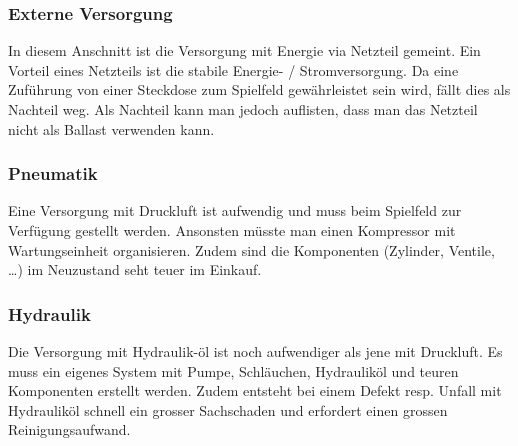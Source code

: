 \subsubsection{Externe Versorgung}
In diesem Anschnitt ist die Versorgung mit Energie via Netzteil gemeint. Ein Vorteil eines Netzteils ist die stabile Energie- / Stromversorgung. Da eine Zuführung von einer Steckdose zum Spielfeld gewährleistet sein wird, fällt dies als Nachteil weg. Als Nachteil kann man jedoch auflisten, dass man das Netzteil nicht als Ballast verwenden kann. 

\subsubsection{Pneumatik}
Eine Versorgung mit Druckluft ist aufwendig und muss beim Spielfeld zur Verfügung gestellt werden. Ansonsten müsste man einen Kompressor mit Wartungseinheit organisieren. Zudem sind die Komponenten (Zylinder, Ventile, …) im Neuzustand seht teuer im Einkauf. 

\subsubsection{Hydraulik}
Die Versorgung mit Hydraulik-öl ist noch aufwendiger als jene mit Druckluft. Es muss ein eigenes System mit Pumpe, Schläuchen, Hydrauliköl und teuren Komponenten erstellt werden. Zudem entsteht bei einem Defekt resp. Unfall mit Hydrauliköl schnell ein grosser Sachschaden und erfordert einen grossen Reinigungsaufwand. 

